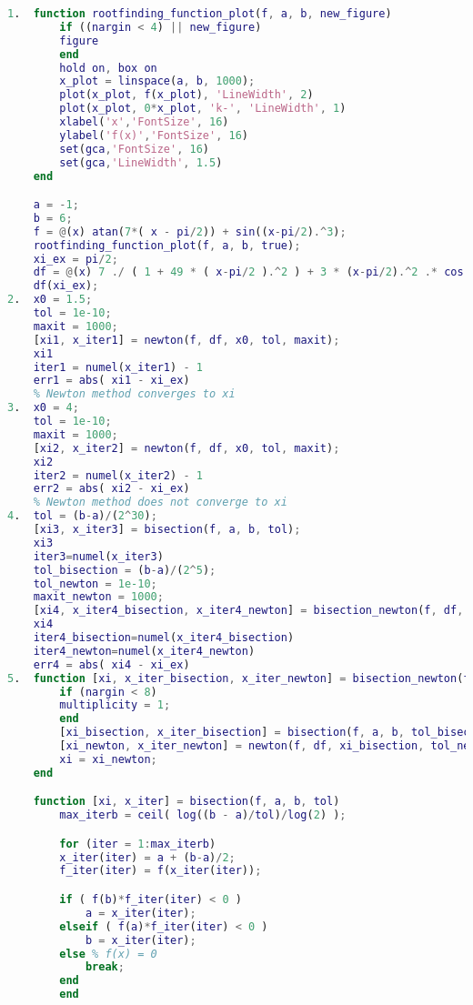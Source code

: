 \documentclass[12pt, a4paper]{report}
\newtheorem[style=M,bodystyle=\normalfont]{theorem}{Theorem}
\newtheorem[style=M,bodystyle=\normalfont]{corollary}{Corollary}
\newtheorem[style=M,bodystyle=\normalfont]{lemma}{Lemma}
\newtheorem[style=M,bodystyle=\normalfont]{definition}{Definition}
\begin{document}
    \begin{Answer}[ref=11]
        \begin{lstlisting}[language=Matlab]
1.  function rootfinding_function_plot(f, a, b, new_figure)
        if ((nargin < 4) || new_figure)
        figure
        end
        hold on, box on
        x_plot = linspace(a, b, 1000);
        plot(x_plot, f(x_plot), 'LineWidth', 2)
        plot(x_plot, 0*x_plot, 'k-', 'LineWidth', 1)
        xlabel('x','FontSize', 16)
        ylabel('f(x)','FontSize', 16)
        set(gca,'FontSize', 16)
        set(gca,'LineWidth', 1.5)
    end

    a = -1;
    b = 6;
    f = @(x) atan(7*( x - pi/2)) + sin((x-pi/2).^3);
    rootfinding_function_plot(f, a, b, true);
    xi_ex = pi/2;
    df = @(x) 7 ./ ( 1 + 49 * ( x-pi/2 ).^2 ) + 3 * (x-pi/2).^2 .* cos( (x-pi/2).^3 );
    df(xi_ex); 
2.  x0 = 1.5;
    tol = 1e-10;
    maxit = 1000;
    [xi1, x_iter1] = newton(f, df, x0, tol, maxit);
    xi1
    iter1 = numel(x_iter1) - 1
    err1 = abs( xi1 - xi_ex)
    % Newton method converges to xi
3.  x0 = 4;
    tol = 1e-10;
    maxit = 1000;
    [xi2, x_iter2] = newton(f, df, x0, tol, maxit);
    xi2
    iter2 = numel(x_iter2) - 1
    err2 = abs( xi2 - xi_ex)
    % Newton method does not converge to xi
4.  tol = (b-a)/(2^30);
    [xi3, x_iter3] = bisection(f, a, b, tol);
    xi3
    iter3=numel(x_iter3)  
    tol_bisection = (b-a)/(2^5);
    tol_newton = 1e-10;
    maxit_newton = 1000;
    [xi4, x_iter4_bisection, x_iter4_newton] = bisection_newton(f, df, a, b, tol_bisection, tol_newton, maxit_newton);
    xi4
    iter4_bisection=numel(x_iter4_bisection)
    iter4_newton=numel(x_iter4_newton)
    err4 = abs( xi4 - xi_ex)
5.  function [xi, x_iter_bisection, x_iter_newton] = bisection_newton(f, df, a, b, tol_bisection, tol_newton, maxit_newton, multiplicity)
        if (nargin < 8)
        multiplicity = 1;
        end
        [xi_bisection, x_iter_bisection] = bisection(f, a, b, tol_bisection);
        [xi_newton, x_iter_newton] = newton(f, df, xi_bisection, tol_newton, maxit_newton, multiplicity);
        xi = xi_newton;
    end

    function [xi, x_iter] = bisection(f, a, b, tol)
        max_iterb = ceil( log((b - a)/tol)/log(2) );

        for (iter = 1:max_iterb)
        x_iter(iter) = a + (b-a)/2;
        f_iter(iter) = f(x_iter(iter));

        if ( f(b)*f_iter(iter) < 0 )
            a = x_iter(iter);
        elseif ( f(a)*f_iter(iter) < 0 )
            b = x_iter(iter);
        else % f(x) = 0
            break;
        end
        end


\end{lstlisting}
\end{Answer}
\end{document}
